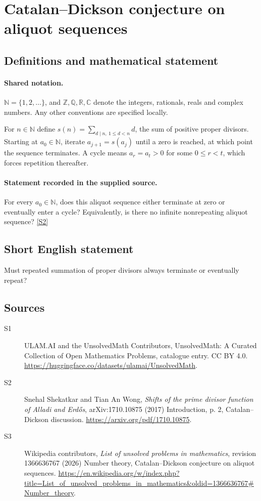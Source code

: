 \documentclass[11pt]{article}
\newcommand{\sref}[2]{\hyperlink{source:#1:#2}{[S#2]}}
\begin{document}
\section{Catalan–Dickson conjecture on aliquot sequences}\label{statement}

\subsection{Definitions and mathematical statement}

\paragraph{Shared notation.}$\mathbb N=\{1,2,\ldots\}$, and $\mathbb Z,\mathbb Q,\mathbb R,\mathbb C$ denote the integers, rationals, reals and complex numbers. Any other conventions are specified locally.


For $n\in\mathbb N$ define $s(n)=\sum_{d\mid n,\ 1\le d<n}d$, the sum of positive proper divisors. Starting at $a_0\in\mathbb N$, iterate $a_{j+1}=s(a_j)$ until a zero is reached, at which point the sequence terminates. A cycle means $a_r=a_t>0$ for some $0\le r<t$, which forces repetition thereafter.
\paragraph{Statement recorded in the supplied source.}
For every $a_0\in\mathbb N$, does this aliquot sequence either terminate at zero or eventually enter a cycle? Equivalently, is there no infinite nonrepeating aliquot sequence? \sref{statement}{2}
\subsection{Short English statement}
Must repeated summation of proper divisors always terminate or eventually repeat?
\subsection{Sources}
\begin{description}
\item[\hypertarget{source:statement:1}{S1}] ULAM.AI and the UnsolvedMath Contributors, UnsolvedMath: A Curated Collection of Open Mathematics Problems, catalogue entry. CC BY 4.0. \url{https://huggingface.co/datasets/ulamai/UnsolvedMath}.
\item[\hypertarget{source:statement:2}{S2}] Snehal Shekatkar and Tian An Wong, \emph{Shifts of the prime divisor function of Alladi and Erd\H{o}s}, arXiv:1710.10875 (2017) Introduction, p. 2, Catalan--Dickson discussion. \url{https://arxiv.org/pdf/1710.10875}.
\item[\hypertarget{source:statement:3}{S3}] Wikipedia contributors, \emph{List of unsolved problems in mathematics}, revision 1366636767 (2026) Number theory, Catalan–Dickson conjecture on aliquot sequences. \url{https://en.wikipedia.org/w/index.php?title=List_of_unsolved_problems_in_mathematics&oldid=1366636767#Number_theory}.
\end{description}
\label{end:statement}
\end{document}
